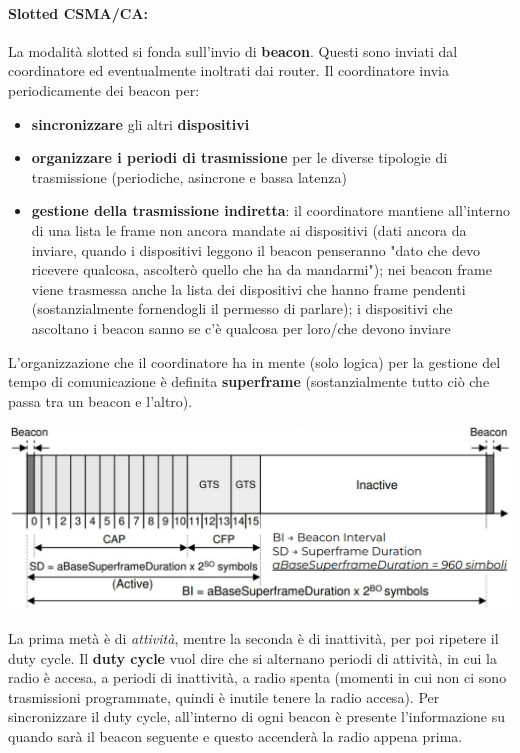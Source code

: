 \paragraph{Slotted CSMA/CA:} La modalità slotted si fonda sull'invio di \textbf{beacon}. Questi sono inviati dal coordinatore ed eventualmente inoltrati dai router. Il coordinatore invia periodicamente dei beacon per:
\begin{itemize}
	\item \textbf{sincronizzare} gli altri \textbf{dispositivi}
	
    \item \textbf{organizzare i periodi di trasmissione} per le diverse tipologie di trasmissione (periodiche, asincrone e bassa latenza)
	
    \item \textbf{gestione della trasmissione indiretta}: il coordinatore mantiene all'interno di una lista le frame non ancora mandate ai dispositivi (dati ancora da inviare, quando i dispositivi leggono il beacon penseranno "dato che devo ricevere qualcosa, ascolterò quello che ha da mandarmi"); nei beacon frame viene trasmessa anche la lista dei dispositivi che hanno frame pendenti (sostanzialmente fornendogli il permesso di parlare); i dispositivi che ascoltano i beacon sanno se c'è qualcosa per loro/che devono inviare
\end{itemize} 

L'organizzazione che il coordinatore ha in mente (solo logica) per la gestione del tempo di comunicazione è definita \textbf{superframe} (sostanzialmente tutto ciò che passa tra un beacon e l'altro).
\begin{center}
	\includegraphics[width=0.98\linewidth]{img/wpan/zsuperframe}
\end{center}

La prima metà è di \textit{attività}, mentre la seconda è di inattività, per poi ripetere il duty cycle. Il \textbf{duty cycle} vuol dire che si alternano periodi di attività, in cui la radio è accesa, a periodi di inattività, a radio spenta (momenti in cui non ci sono trasmissioni programmate, quindi è inutile tenere la radio accesa). Per sincronizzare il duty cycle, all'interno di ogni beacon è presente l'informazione su quando sarà il beacon seguente e questo accenderà la radio appena prima. 

